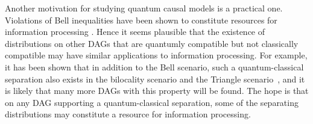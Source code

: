 \documentclass[aps,english,superscriptaddress,onecolumn,twoside,longbibliography,pra,floatfix,fleqn,nofootinbib]{revtex4-1}%
\theoremstyle{definition}
\begin{document}
Another motivation for studying quantum causal models is a practical one.  Violations of Bell inequalities have  been shown to constitute resources for information processing \cite{NoSigPolytope,scarani2012device,BancalDIApproach}. Hence it seems plausible that the existence of distributions on other DAGs that are quantumly compatible but not classically compatible may have similar applications to information processing. 
For example, it has been shown that in addition to the Bell scenario, such a quantum-classical separation also exists 
in the bilocality scenario \cite{BilocalCorrelations} and the Triangle scenario~\cite{fritz2012bell}, and it is likely that many more DAGs with this property will be found.  The hope is that on any DAG supporting a quantum-classical separation, some of the separating distributions may constitute a resource for information processing. 

\end{document}
